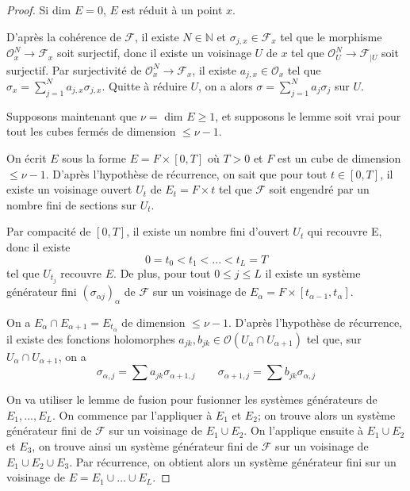\documentclass{article}
\theoremstyle{definition}
\theoremstyle{remarque}
\begin{document}
\begin{proof}
Si dim $E = 0$, $E$ est réduit à un point $x$.

D'après la cohérence de $\mathcal{F}$, il existe $N \in \mathbb{N}$ et $\sigma_{j,x} \in \mathcal{F}_x$ tel que le morphisme $\mathcal{O}^N_x \to \mathcal{F}_x$ soit surjectif, donc il existe un voisinage $U$ de $x$ tel que $\mathcal{O}^N_U \to \mathcal{F}_{|U}$ soit surjectif.
Par surjectivité de $\mathcal{O}^N_x \to \mathcal{F}_x$, il existe $a_{j,x} \in \mathcal{O}_x$ tel que $\sigma_x = \sum_{j=1}^N a_{j,x}\sigma_{j,x}$. Quitte à réduire $U$, on a alors $\sigma = \sum_{j=1}^N a_j\sigma_j$ sur $U$.

Supposons maintenant que $\nu = $ dim $E \geq 1$, et supposons le lemme soit vrai pour tout les cubes fermés de dimension $\leq \nu - 1$.

On écrit $E$ sous la forme $E = F \times [0, T]$ où $T > 0$ et $F$ est un cube de dimension $\leq \nu - 1$. D'après l'hypothèse de récurrence, on sait que pour tout $t \in [0, T]$, il existe un voisinage ouvert $U_t$ de $E_t = F \times {t}$ tel que $\mathcal{F}$ soit engendré par un nombre fini de sections sur $U_t$.

Par compacité de $[0, T]$, il existe un nombre fini d'ouvert $U_t$ qui recouvre E, donc il existe $$0 = t_0 < t_1 < ... < t_L = T$$ tel que ${U_{t_j}}$ recouvre $E$. De plus, pour tout $0 \leq j \leq L$ il existe un système générateur fini $(\sigma_{\alpha j})_\alpha$ de $\mathcal{F}$ sur un voisinage de $E_\alpha = F \times [t_{\alpha - 1}, t_\alpha]$.

On a $E_\alpha \cap E_{\alpha+1} = E_{t_\alpha}$ de dimension $\leq \nu - 1$. D'après l'hypothèse de récurrence, il existe des fonctions holomorphes $a_{jk}, b_{jk} \in \mathcal{O}(U_\alpha \cap U_{\alpha +1})$ tel que, sur $U_\alpha \cap U_{\alpha +1}$, on a
\begin{equation*}
\sigma_{\alpha,j} = \sum a_{jk}\sigma_{\alpha+1,j} \qquad
\sigma_{\alpha+1,j} = \sum b_{jk}\sigma_{\alpha,j}
\end{equation*}

On va utiliser le lemme de fusion pour fusionner les systèmes générateurs de $E_1, ..., E_L$. On commence par l'appliquer à $E_1$ et $E_2$; on trouve alors un système générateur fini de $\mathcal{F}$ sur un voisinage de $E_1 \cup E_2$. On l'applique ensuite à $E_1 \cup E_2$ et $E_3$, on trouve ainsi un système générateur fini de $\mathcal{F}$ sur un voisinage de $E_1 \cup E_2 \cup E_3$. Par récurrence, on obtient alors un système générateur fini sur un voisinage de $E=E_1 \cup ... \cup E_L$.


\end{proof}
\end{document}
